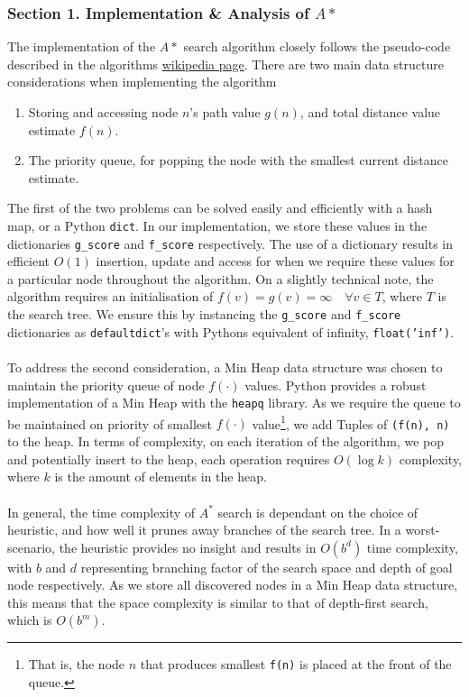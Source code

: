 \documentclass{article}
\def\code#1{\texttt{#1}}
\begin{document}
\subsubsection*{Section 1. Implementation \& Analysis of $A*$}
The implementation of the $A*$ search algorithm closely follows the pseudo-code described in the algorithms \href{https://en.wikipedia.org/wiki/A*_search_algorithm}{wikipedia page}. There are two main data structure considerations when implementing the algorithm 
\begin{enumerate}
    \item Storing and accessing node $n$'s path value $g(n)$, and total distance value estimate $f(n)$.
    \item The priority queue, for popping the node with the smallest current distance estimate. 
\end{enumerate}
The first of the two problems can be solved easily and efficiently with a hash map, or a Python \code{dict}. In our implementation, we store these values in the dictionaries \code{g\_score} and \code{f\_score} respectively. The use of a dictionary results in efficient $O(1)$ insertion, update and access for when we require these values for a particular node throughout the algorithm. On a slightly technical note,  the algorithm requires an initialisation of $f(v) = g(v) = \infty \quad  \forall v\in T$, where $T$ is the search tree. We ensure this by instancing the \code{g\_score} and \code{f\_score} dictionaries as \code{defaultdict}'s with Pythons equivalent of infinity, \code{float('inf')}. \\
\\
To address the second consideration, a Min Heap data structure was chosen to maintain the priority queue of node $f(\cdot)$ values. Python provides a robust implementation of a Min Heap with the \code{heapq} library. As we require the queue to be maintained on priority of smallest $f(\cdot)$ value\footnote{That is, the node $n$ that produces smallest \code{f(n)} is placed at the front of the queue.}, we add Tuples of \code{(f(n), n)} to the heap. In terms of complexity, on each iteration of the algorithm, we pop and potentially insert to the heap, each operation requires $O(\log k)$ complexity, where $k$ is the amount of elements in the heap.\\
\\
In general, the time complexity of $A^*$ search is dependant on the choice of heuristic, and how well it prunes away branches of the search tree. In a worst-scenario, the heuristic provides no insight and results in $O(b^d)$ time complexity, with $b$ and $d$ representing branching factor of the search space and depth of goal node respectively. As we store all discovered nodes in a Min Heap data structure, this means that the space complexity is similar to that of depth-first search, which is $O(b^m)$.
\end{document}
